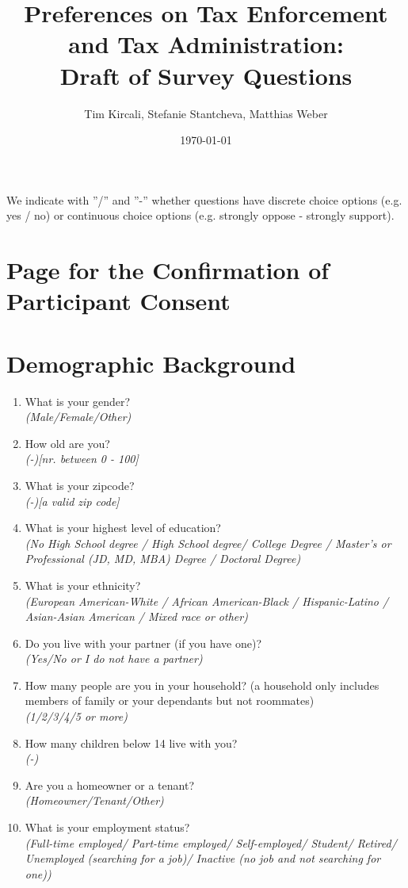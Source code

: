 \documentclass[11pt]{article}
\title{Preferences on Tax Enforcement and Tax Administration:\\Draft of Survey Questions}
\author{Tim Kircali, Stefanie Stantcheva, Matthias Weber}
\date{\today} %
\begin{document}
\maketitle

\noindent We indicate with ”/” and ”-” whether questions have discrete choice options (e.g. yes / no) or continuous choice options (e.g. strongly oppose - strongly support). 
\section*{Page for the Confirmation of Participant Consent}
\section*{Demographic Background}
\begin{enumerate}
    \item What is your gender? \\ \textit{(Male/Female/Other)} 
    \item How old are you? \\ \textit{(-)[nr. between 0 - 100]}
    \item What is your zipcode? \\ \textit{(-)[a valid zip code]}
    \item What is your highest level of education? \\ \textit{(No High School degree / High School degree/ College Degree / Master’s or Professional (JD, MD, MBA) Degree / Doctoral Degree)}
    \item What is your ethnicity? \\ \textit{(European American-White / African American-Black / Hispanic-Latino / Asian-Asian American / Mixed race or other)}
    \item Do you live with your partner (if you have one)? \\ \textit{(Yes/No or I do not have a partner)}
    \item How many people are you in your household? (a household only includes members of family or your dependants but not roommates) \\ \textit{(1/2/3/4/5 or more)}
    \item How many children below 14 live with you? \\ \textit{(-)}
    \item Are you a homeowner or a tenant? \\ \textit{(Homeowner/Tenant/Other)}
    \item What is your employment status? \\ \textit{(Full-time employed/ Part-time employed/ Self-employed/ Student/ Retired/ Unemployed (searching for a job)/ Inactive (no job and not searching for one))}

\end{enumerate}
\end{document}
